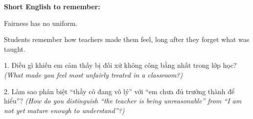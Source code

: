 \begin{ghinhoanh}
\textbf{Short English to remember:}

Fairness has no uniform.

Students remember how teachers made them feel, long after they forget what was taught.
\end{ghinhoanh}

\begin{tuhocnhanh}
1. Điều gì khiến em cảm thấy bị đối xử không công bằng nhất trong lớp học? \textit{(What made you feel most unfairly treated in a classroom?)}

2. Làm sao phân biệt ``thầy cô đang vô lý'' với ``em chưa đủ trưởng thành để hiểu''? \textit{(How do you distinguish ``the teacher is being unreasonable'' from ``I am not yet mature enough to understand''?)}
\end{tuhocnhanh}

\ngancach
